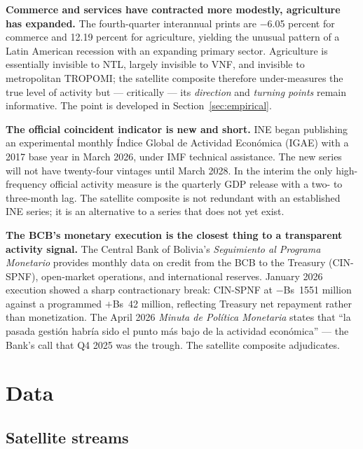 \documentclass[11pt,letterpaper]{article}
\newcommand{\claim}[1]{\textbf{#1.}}
\begin{document}
\claim{Commerce and services have contracted more modestly, agriculture has expanded} The fourth-quarter interannual prints are \num{-6.05} percent for commerce and \num{+12.19} percent for agriculture, yielding the unusual pattern of a Latin American recession with an expanding primary sector. Agriculture is essentially invisible to NTL, largely invisible to VNF, and invisible to metropolitan TROPOMI; the satellite composite therefore under-measures the true level of activity but --- critically --- its \emph{direction} and \emph{turning points} remain informative. The point is developed in Section~\ref{sec:empirical}.

\claim{The official coincident indicator is new and short} INE began publishing an experimental monthly Índice Global de Actividad Económica (IGAE) with a \num{2017} base year in March \num{2026}, under IMF technical assistance. The new series will not have twenty-four vintages until March \num{2028}. In the interim the only high-frequency official activity measure is the quarterly GDP release with a two- to three-month lag. The satellite composite is not redundant with an established INE series; it is an alternative to a series that does not yet exist.

\claim{The BCB's monetary execution is the closest thing to a transparent activity signal} The Central Bank of Bolivia's \emph{Seguimiento al Programa Monetario} provides monthly data on credit from the BCB to the Treasury (CIN-SPNF), open-market operations, and international reserves. January \num{2026} execution showed a sharp contractionary break: CIN-SPNF at $-$Bs~\num{1551} million against a programmed $+$Bs~\num{42} million, reflecting Treasury net repayment rather than monetization. The April \num{2026} \emph{Minuta de Política Monetaria} states that ``la pasada gestión habría sido el punto más bajo de la actividad económica'' --- the Bank's call that Q4 \num{2025} was the trough. The satellite composite adjudicates.

\section{Data}
\label{sec:data}

\subsection{Satellite streams}
\end{document}
